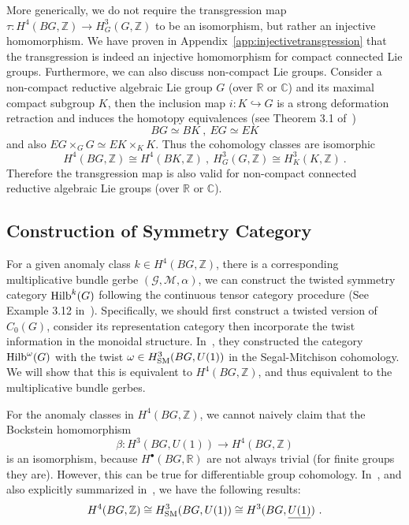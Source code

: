 \documentclass[a4paper,11pt]{article}
\newcommand{\be}{\begin{equation}}
\newcommand{\ee}{\end{equation}}
\def\bbC{\mathbb{C}}
\def\bbR{\mathbb{R}}
\def\bbZ{\mathbb{Z}}
\begin{document}
More generically, we do not require the transgression map $\tau:H^4(BG,\bbZ)\to H^3_G(G,\bbZ)$ to be an isomorphism, but rather an injective homomorphism. We have proven in Appendix~\ref{app:injectivetransgression} that the transgression is indeed an injective homomorphism for compact connected Lie groups. Furthermore, we can also discuss non-compact Lie groups. Consider a non-compact reductive algebraic Lie group $G$ (over $\bbR$ or $\bbC$) and its maximal compact subgroup $K$, then the inclusion map $i:K\hookrightarrow G$ is a strong deformation retraction and induces the homotopy equivalences (see Theorem 3.1 of~\cite{Adem:2013pjx})
\be BG\simeq BK \ , \ EG\simeq EK \ee
and also $ EG\times _G G \simeq EK\times_K K $. Thus the cohomology classes are isomorphic
\be H^4(BG,\bbZ) \cong H^4(BK,\bbZ) \ , \ H^3_G(G,\bbZ) \cong H^3_K(K,\bbZ) \ .  \ee
Therefore the transgression map is also valid for non-compact connected reductive algebraic Lie groups (over $\bbR$ or $\bbC$).

\subsection{Construction of Symmetry Category}
For a given anomaly class $k\in H^4(BG,\bbZ)$, there is a corresponding multiplicative bundle gerbe $(\mathscr{G},\mathscr{M},\alpha)$, we can construct the twisted symmetry category ${\rm Hilb}^k(G)$ following the continuous tensor category procedure (See Example 3.12 in~\cite{Marin-Salvador:2025stc}). Specifically, we should first construct a twisted version of $C_0(G)$, consider its representation category then incorporate the twist information in the monoidal structure. In~\cite{Marin-Salvador:2025stc}, they constructed the category ${\rm Hilb}^\omega(G)$ with the twist $\omega\in H^3_{\rm SM}(BG,U(1))$ in the Segal-Mitchison cohomology. We will show that this is equivalent to $H^4(BG,\bbZ)$, and thus equivalent to the multiplicative bundle gerbes.

For the anomaly classes in $H^4(BG,\bbZ)$, we cannot naively claim that the Bockstein homomorphism
\be
\beta : H^3(BG,U(1)) \to H^4(BG,\bbZ)
\ee
is an isomorphism, because $H^\bullet(BG,\bbR)$ are not always trivial (for finite groups they are). However, this can be true for differentiable group cohomology. In~\cite{Brylinski:2000dcg,Wagemann:2015ctg}, and also explicitly summarized in~\cite{Liu:2026atf}, we have the following results:
\be H^4(BG,\bbZ) \cong H^3_{\rm SM}(BG,U(1)) \cong H^3(BG,\underline{U(1)}) \ .  \ee
\end{document}
